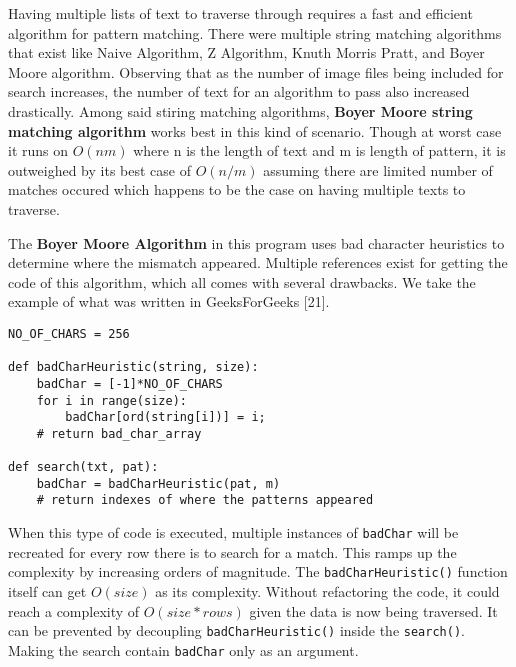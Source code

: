 \hspace\parindent
Having multiple lists of text to traverse through requires a fast and efficient algorithm for
pattern matching. There were multiple string matching algorithms that exist like Naive Algorithm, Z
Algorithm, Knuth Morris Pratt, and Boyer Moore algorithm.  Observing that
as the number of image files being included for search increases, the number of text for 
an algorithm to pass also increased drastically. Among said stiring matching algorithms,
\textbf{Boyer Moore string matching algorithm} works best in this kind of scenario. Though at worst
case it runs on $O(nm)$ where n is the length of text and m is length of pattern, it is outweighed
by its best case of $O(n/m)$ assuming there are limited number of matches occured which happens to
be the case on having multiple texts to traverse.

\hfill

The \textbf{Boyer Moore Algorithm} in this program uses bad character heuristics to determine where
the mismatch appeared. Multiple references exist for getting the code of this algorithm, which all
comes with several drawbacks. We take the example of what was written in GeeksForGeeks [21]. 

\hfill

\begin{tcolorbox}[colback=white, title=\textbf{Bad Character Preprocessing}]
    \begin{lstlisting}[style=py]
NO_OF_CHARS = 256
 
def badCharHeuristic(string, size):
    badChar = [-1]*NO_OF_CHARS
    for i in range(size):
        badChar[ord(string[i])] = i;
    # return bad_char_array

def search(txt, pat):
    badChar = badCharHeuristic(pat, m)
    # return indexes of where the patterns appeared
\end{lstlisting}
\end{tcolorbox}


\hfill

When this type of code is executed, multiple instances of \texttt{badChar} will be recreated for
every row there is to search for a match. This ramps up the complexity by increasing orders of
magnitude. The \texttt{badCharHeuristic()} function itself can get $O(size)$ as its complexity.
Without refactoring the code, it could reach a complexity of $O(size*rows)$ given the data is now
being traversed. It can be
prevented by decoupling \texttt{badCharHeuristic()} inside the \texttt{search()}. Making the search
contain \texttt{badChar} only as an argument.

